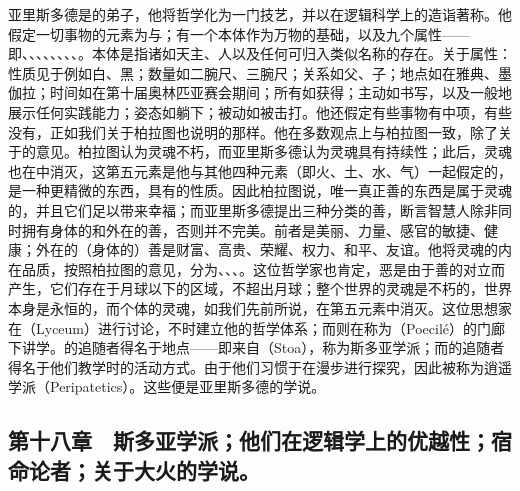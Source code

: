 亚里斯多德是的弟子，他将哲学化为一门技艺，并以在逻辑科学上的造诣著称。他假定一切事物的元素为与；有一个本体作为万物的基础，以及九个属性——即、、、、、、、、。本体是指诸如天主、人以及任何可归入类似名称的存在。关于属性：性质见于例如白、黑；数量如二腕尺、三腕尺；关系如父、子；地点如在雅典、墨伽拉；时间如在第十届奥林匹亚赛会期间；所有如获得；主动如书写，以及一般地展示任何实践能力；姿态如躺下；被动如被击打。他还假定有些事物有中项，有些没有，正如我们关于柏拉图也说明的那样。他在多数观点上与柏拉图一致，除了关于的意见。柏拉图认为灵魂不朽，而亚里斯多德认为灵魂具有持续性；此后，灵魂也在中消灭，这第五元素是他与其他四种元素（即火、土、水、气）一起假定的，是一种更精微的东西，具有的性质。因此柏拉图说，唯一真正善的东西是属于灵魂的，并且它们足以带来幸福；而亚里斯多德提出三种分类的善，断言智慧人除非同时拥有身体的和外在的善，否则并不完美。前者是美丽、力量、感官的敏捷、健康；外在的（身体的）善是财富、高贵、荣耀、权力、和平、友谊。他将灵魂的内在品质，按照柏拉图的意见，分为、、、。这位哲学家也肯定，恶是由于善的对立而产生，它们存在于月球以下的区域，不超出月球；整个世界的灵魂是不朽的，世界本身是永恒的，而个体的灵魂，如我们先前所说，在第五元素中消灭。这位思想家在（Lyceum）进行讨论，不时建立他的哲学体系；而则在称为（Poecilé）的门廊下讲学。的追随者得名于地点——即来自（Stoa），称为斯多亚学派；而的追随者得名于他们教学时的活动方式。由于他们习惯于在漫步进行探究，因此被称为逍遥学派（Peripatetics）。这些便是亚里斯多德的学说。\par


\subsection{第十八章　斯多亚学派；他们在逻辑学上的优越性；宿命论者；关于大火的学说。}

